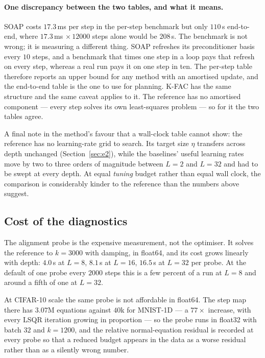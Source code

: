\documentclass{article} %
\theoremstyle{plain}
\theoremstyle{definition}
\theoremstyle{remark}
\begin{document}
\paragraph{One discrepancy between the two tables, and what it means.} SOAP costs $17.3$\,ms per
step in the per-step benchmark but only $110$\,s end-to-end, where $17.3$\,ms $\times\,12000$ steps
alone would be $208$\,s. The benchmark is not wrong; it is measuring a different thing. SOAP
refreshes its preconditioner basis every $10$ steps, and a benchmark that times one step in a loop
pays that refresh on every step, whereas a real run pays it on one step in ten. The per-step table
therefore reports an upper bound for any method with an amortised update, and the end-to-end table
is the one to use for planning. K-FAC has the same structure and the same caveat applies to it.
The reference has no amortised component --- every step solves its own least-squares problem --- so
for it the two tables agree.

A final note in the method's favour that a wall-clock table cannot show: the reference has no
learning-rate grid to search. Its target size $\eta$ transfers across depth unchanged
(Section~\ref{sec:e2}), while the baselines' useful learning rates move by two to three orders of
magnitude between $L=2$ and $L=32$ and had to be swept at every depth. At equal \emph{tuning}
budget rather than equal wall clock, the comparison is considerably kinder to the reference than
the numbers above suggest.

\subsection{Cost of the diagnostics}

The alignment probe is the expensive measurement, not the optimiser. It solves the reference to
$k = 3000$ with damping, in float64, and its cost grows linearly with depth: $4.0$\,s at $L=8$,
$8.1$\,s at $L=16$, $16.5$\,s at $L=32$ per probe. At the default of one probe every $2000$ steps
this is a few percent of a run at $L=8$ and around a fifth of one at $L=32$.

At CIFAR-10 scale the same probe is not affordable in float64. The step map there has $3.07$M
equations against $40$k for MNIST-1D --- a $77\times$ increase, with every LSQR iteration growing
in proportion --- so the probe runs in float32 with batch $32$ and $k = 1200$, and the relative
normal-equation residual is recorded at every probe so that a reduced budget appears in the data as
a worse residual rather than as a silently wrong number.
\end{document}
